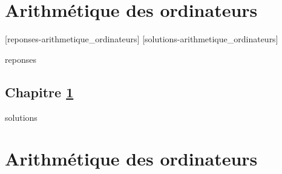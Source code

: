 \chapter{Arithmétique des ordinateurs}
\label{chap:ordinateurs}


[reponses-arithmetique_ordinateurs]
[solutions-arithmetique_ordinateurs]

\begin{Filesave}{reponses}
\section*{Chapitre \ref{chap:ordinateurs}}

\end{Filesave}

\begin{Filesave}{solutions}
\chapter{Arithmétique des ordinateurs}

\end{Filesave}


